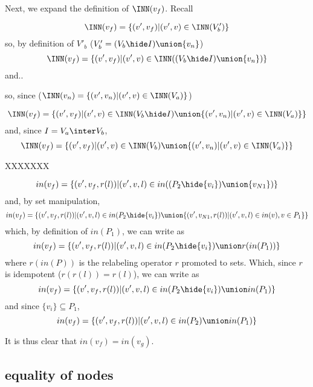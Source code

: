 Next, we expand the definition of $\INN(v_f)$. Recall 


\[
 \INN(v_f) = \{(v',v_f)|(v',v) \in \INN(V'_b) \}\\
\]
\noindent
so, by definition of $V'_b$ ($V'_b = (V_b\hide I)\union\{v_{n}\}$)
\[
 \INN(v_f) = \{(v',v_f)|(v',v) \in \INN((V_b\hide I)\union\{v_{n}\}) \}\\
 \]
   and..



   so, since ($\INN(v_n) = \{(v',v_n)|(v',v) \in \INN(V_a) \}$)
   
\[
 \INN(v_f) = \{(v',v_f)|(v',v) \in \INN(V_b\hide I)\union  \{(v',v_n)|(v',v) \in \INN(V_a) \} \}\\
\]
\noindent
and,  since $I = V_a \inter V_b$, 
\[
 \INN(v_f) = \{(v',v_f)|(v',v) \in \INN(V_b)\union  \{(v',v_n)|(v',v) \in \INN(V_a) \} \}\\
\]

XXXXXXX

\[
in(v_f) = \{(v',v_f,r(l))|(v',v,l) \in in((P_2\hide\{v_i\}) \union \{v_{N1}\})\}
\]
\noindent
and, by set manipulation, 
\[
in(v_f) = \{(v',v_f,r(l))|(v',v,l) \in in(P_2\hide\{v_i\}) \union  \{(v',v_{N1},r(l))|(v',v,l)\in in(v), v\in P_1\}\}
\]
\noindent
which, by definition of $in(P_1)$, we can write as
\[
in(v_f) = \{(v',v_f,r(l))|(v',v,l) \in in(P_2\hide\{v_i\}) \union  r(in(P_1))\}
\]
\noindent
where $r(in(P))$ is the relabeling operator $r$ promoted to sets.  Which, since $r$ is idempotent ($r(r(l)) = r(l)$), we can write as
\[
in(v_f) = \{(v',v_f,r(l))|(v',v,l) \in in(P_2\hide\{v_i\}) \union  in(P_1)\}
\]
\noindent
and since $\{v_i\} \subseteq P_1$, 
\[
in(v_f) = \{(v',v_f,r(l))|(v',v,l) \in in(P_2) \union  in(P_1)\}
\]

%





It is thus clear that $in(v_f)=in(v_g)$. 


\subsection{equality of nodes}

